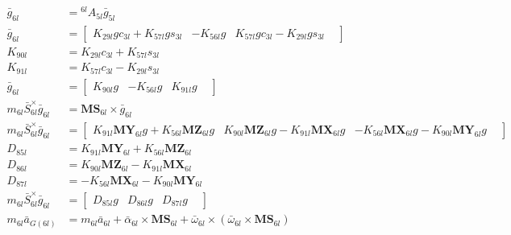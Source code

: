 \begin{align}
 \nonumber \\ 
 \bar{g}_{6l} &= {}^{6l}A_{5l} \bar{g}_{5l} 
 \nonumber \\ 
 \bar{g}_{6l} &= \left[\begin{matrix} K_{29l}gc_{3l} + K_{57l}gs_{3l} & -K_{56l}g & K_{57l}gc_{3l} - K_{29l}gs_{3l} &  \end{matrix}\right] 
 \nonumber \\ 
K_{90l} &= K_{29l}c_{3l} + K_{57l}s_{3l} \nonumber \\
K_{91l} &= K_{57l}c_{3l} - K_{29l}s_{3l} \nonumber \\
 \bar{g}_{6l} &= \left[\begin{matrix} K_{90l}g & -K_{56l}g & K_{91l}g &  \end{matrix}\right] 
 \nonumber \\ 
 m_{6l}\bar{S}_{6l}^{\times}\bar{g}_{6l} &= \mathbf{MS}_{6l} \times \bar{g}_{6l} 
 \nonumber \\ 
 m_{6l}\bar{S}_{6l}^{\times}\bar{g}_{6l} &= \left[\begin{matrix} K_{91l}\mathbf{MY}_{6l}g + K_{56l}\mathbf{MZ}_{6l}g & K_{90l}\mathbf{MZ}_{6l}g - K_{91l}\mathbf{MX}_{6l}g & - K_{56l}\mathbf{MX}_{6l}g - K_{90l}\mathbf{MY}_{6l}g &  \end{matrix}\right] 
 \nonumber \\ 
D_{85l} &= K_{91l}\mathbf{MY}_{6l} + K_{56l}\mathbf{MZ}_{6l} \nonumber \\
D_{86l} &= K_{90l}\mathbf{MZ}_{6l} - K_{91l}\mathbf{MX}_{6l} \nonumber \\
D_{87l} &= - K_{56l}\mathbf{MX}_{6l} - K_{90l}\mathbf{MY}_{6l} \nonumber \\
 m_{6l}\bar{S}_{6l}^{\times}\bar{g}_{6l} &= \left[\begin{matrix} D_{85l}g & D_{86l}g & D_{87l}g &  \end{matrix}\right] 
 \nonumber \\ 
 m_{6l}\bar{a}_{G(6l)} &= m_{6l}\bar{a}_{6l} + \bar\alpha_{6l} \times \mathbf{MS}_{6l} + \bar\omega_{6l} \times \left(\bar\omega_{6l} \times \mathbf{MS}_{6l}\right) 
 \nonumber \\ 

\end{align}
